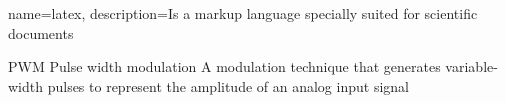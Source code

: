 
{
    name=latex,
    description={Is a markup language specially suited 
    for scientific documents}
}

    {PWM}
    {Pulse width modulation}
    {A modulation technique that generates variable-width pulses to represent the amplitude of an analog input signal}
